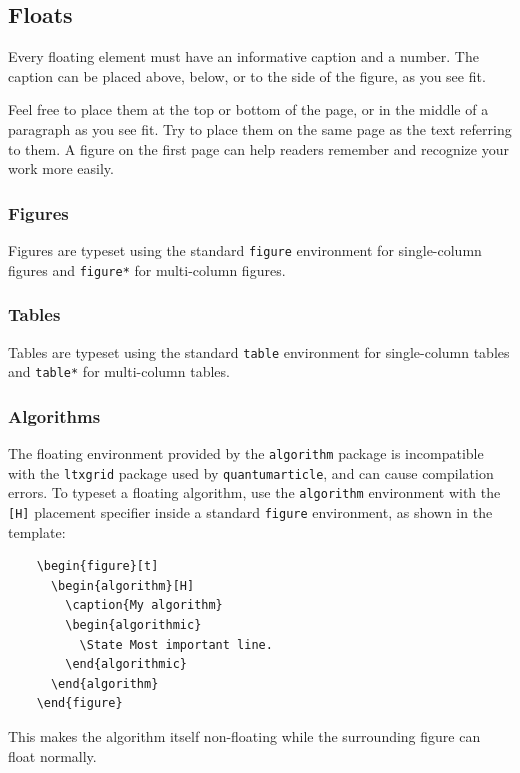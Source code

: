 \documentclass[a4paper,noarxiv,onecolumn]{quantumarticle}
\begin{document}
	\subsection{Floats}
	Every floating element must have an informative caption and a number. The caption can be placed above, below, or to the side of the figure, as you see fit.

	Feel free to place them at the top or bottom of the page, or in the middle of a paragraph as you see fit. Try to place them on the same page as the text referring to them. A figure on the first page can help readers remember and recognize your work more easily.

	\subsubsection{Figures}
	Figures are typeset using the standard \texttt{figure} environment for single-column figures and \texttt{figure*} for multi-column figures.

	\subsubsection{Tables}
	Tables are typeset using the standard \texttt{table} environment for single-column tables and \texttt{table*} for multi-column tables.

	\subsubsection{Algorithms}
	The floating environment provided by the \texttt{algorithm} package is incompatible with the \texttt{ltxgrid} package used by \texttt{quantumarticle}, and can cause compilation errors. To typeset a floating algorithm, use the \texttt{algorithm} environment with the \texttt{[H]} placement specifier inside a standard \texttt{figure} environment, as shown in the template:
	\begin{verbatim}
	\begin{figure}[t]
	  \begin{algorithm}[H]
	    \caption{My algorithm}
	    \begin{algorithmic}
	      \State Most important line.
	    \end{algorithmic}
	  \end{algorithm}
	\end{figure}
	\end{verbatim}
	This makes the algorithm itself non-floating while the surrounding figure can float normally.
\end{document}
